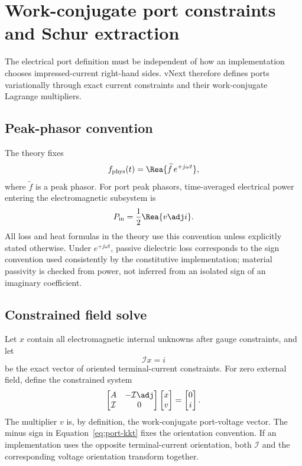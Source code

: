 \section{Work-conjugate port constraints and Schur extraction}
\label{sec:port-schur}

The electrical port definition must be independent of how an implementation
chooses impressed-current right-hand sides. vNext therefore defines ports
variationally through exact current constraints and their work-conjugate
Lagrange multipliers.

\subsection{Peak-phasor convention}

The theory fixes
\[
  f_{\rm phys}(t)
  =
  \Rea\{\widetilde f\,e^{+j\omega t}\},
\]
where $\widetilde f$ is a peak phasor. For port peak phasors,
time-averaged electrical power entering the electromagnetic subsystem is
\[
  P_{\rm in}
  =
  \frac12\Rea\{v\adj i\}.
  \label{eq:peak-power}
\]
All loss and heat formulas in the theory use this convention unless explicitly
stated otherwise. Under $e^{+j\omega t}$, passive dielectric loss corresponds
to the sign convention used consistently by the constitutive implementation;
material passivity is checked from power, not inferred from an isolated sign of
an imaginary coefficient.

\subsection{Constrained field solve}

Let $x$ contain all electromagnetic internal unknowns after gauge constraints,
and let
\[
  \mathcal I x=i
\]
be the exact vector of oriented terminal-current constraints. For zero external
field, define the constrained system
\[
 \begin{bmatrix}
   A & -\mathcal I\adj\\
   \mathcal I & 0
 \end{bmatrix}
 \begin{bmatrix}
   x\\v
 \end{bmatrix}
 =
 \begin{bmatrix}
   0\\i
 \end{bmatrix}.
 \label{eq:port-kkt}
\]
The multiplier $v$ is, by definition, the work-conjugate port-voltage vector.
The minus sign in Equation~\eqref{eq:port-kkt} fixes the orientation convention.
If an implementation uses the opposite terminal-current orientation, both
$\mathcal I$ and the corresponding voltage orientation transform together.

